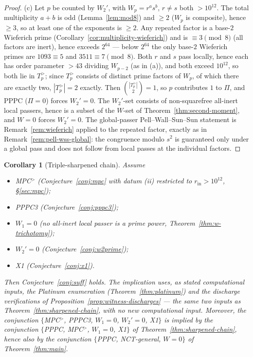 \documentclass[11pt]{amsart}
\theoremstyle{plain}
\newtheorem{corollary}[theorem]{Corollary}
\theoremstyle{definition}
\theoremstyle{remark}
\numberwithin{equation}{section}
\begin{document}
\begin{proof}
(c) Let $p$ be counted by $W_2'$, with $W_p = r^a s^b$, $r \neq s$ both $> 10^{12}$. The total multiplicity $a + b$ is odd (Lemma~\ref{lem:mod8}) and $\geq 2$ ($W_p$ is composite), hence $\geq 3$, so at least one of the exponents is $\geq 2$. Any repeated factor is a base-$2$ Wieferich prime (Corollary~\ref{cor:multiplicity-wieferich}) and is $\equiv 3 \pmod 8$ (all factors are inert), hence exceeds $2^{64}$ --- below $2^{64}$ the only base-$2$ Wieferich primes are $1093 \equiv 5$ and $3511 \equiv 7 \pmod 8$. Both $r$ and $s$ pass locally, hence each has order parameter $> 43$ dividing $W_{p-2}$ (as in (a)), and both exceed $10^{12}$, so both lie in $T_p^{>}$; since $T_p^{>}$ consists of distinct prime factors of $W_p$, of which there are exactly two, $|T_p^{>}| = 2$ exactly. Then $\binom{|T_p^{>}|}{2} = 1$, so $p$ contributes $1$ to $\Pi$, and PPPC ($\Pi = 0$) forces $W_2' = 0$. The $W_2'$-set consists of non-squarefree all-inert local passers, hence is a subset of the $W$-set of Theorem~\ref{thm:second-moment}, and $W = 0$ forces $W_2' = 0$. The global-passer Pell--Wall--Sun--Sun statement is Remark~\ref{rem:wieferich} applied to the repeated factor, exactly as in Remark~\ref{rem:pell-wss-global}: the congruence modulo $s^2$ is guaranteed only under a global pass and does not follow from local passes at the individual factors.
\end{proof}

\begin{corollary}[Triple-sharpened chain]\label{cor:triple-chain}
Assume
\begin{itemize}
\item MPC$^{>}$ (Conjecture~\ref{conj:mpc} with datum (ii) restricted to $r_{\mathrm{in}} > 10^{12}$, \S\ref{sec:mpc});
\item PPPC3 (Conjecture~\ref{conj:pppc3});
\item $W_1 = 0$ (no all-inert local passer is a prime power, Theorem~\ref{thm:w-trichotomy});
\item $W_2' = 0$ (Conjecture~\ref{conj:w2prime});
\item X1 (Conjecture~\ref{conj:x1}).
\end{itemize}
Then Conjecture~\ref{conj:suff} holds. The implication uses, as stated computational inputs, the Platinum enumeration (Theorem~\ref{thm:platinum}) and the discharge verifications of Proposition~\ref{prop:witness-discharges} --- the same two inputs as Theorem~\ref{thm:sharpened-chain}, with no new computational input. Moreover, the conjunction $\{$MPC$^{>}$, PPPC3, $W_1 = 0$, $W_2' = 0$, X1$\}$ is implied by the conjunction $\{$PPPC, MPC$^{>}$, $W_1 = 0$, X1$\}$ of Theorem~\ref{thm:sharpened-chain}, hence also by the conjunction $\{$PPPC, NCT-general, $W = 0\}$ of Theorem~\ref{thm:main}.
\end{corollary}
\end{document}

